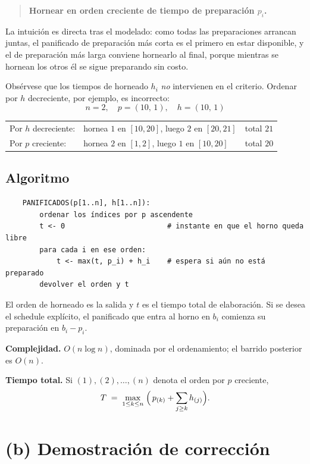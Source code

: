 \documentclass[11pt,a4paper]{article}
\theoremstyle{plain}
\theoremstyle{definition}
\theoremstyle{remark}
\begin{document}
\begin{quote}
\textbf{Hornear en orden creciente de tiempo de preparación $p_i$.}
\end{quote}

La intuición es directa tras el modelado: como todas las preparaciones arrancan
juntas, el panificado de preparación más corta es el primero en estar
disponible, y el de preparación más larga conviene hornearlo al final, porque
mientras se hornean los otros él se sigue preparando sin costo.

Obsérvese que los tiempos de horneado $h_i$ \emph{no} intervienen en el
criterio. Ordenar por $h$ decreciente, por ejemplo, es incorrecto:
\[
  n = 2, \quad p = (10,\,1), \quad h = (10,\,1)
\]
\begin{center}
\begin{tabular}{lll}
  Por $h$ decreciente: & hornea $1$ en $[10,20]$, luego $2$ en $[20,21]$
    & total $21$ \\
  Por $p$ creciente:   & hornea $2$ en $[1,2]$, \; luego $1$ en $[10,20]$
    & total $20$
\end{tabular}
\end{center}

\subsection*{Algoritmo}

\begin{verbatim}
    PANIFICADOS(p[1..n], h[1..n]):
        ordenar los índices por p ascendente
        t <- 0                        # instante en que el horno queda libre
        para cada i en ese orden:
            t <- max(t, p_i) + h_i    # espera si aún no está preparado
        devolver el orden y t
\end{verbatim}

El orden de horneado es la salida y $t$ es el tiempo total de elaboración. Si se
desea el schedule explícito, el panificado que entra al horno en $b_i$ comienza
su preparación en $b_i - p_i$.

\medskip
\noindent
\textbf{Complejidad.} $O(n\log n)$, dominada por el ordenamiento; el barrido
posterior es $O(n)$.

\medskip
\noindent
\textbf{Tiempo total.} Si $(1),(2),\dots,(n)$ denota el orden por $p$ creciente,
\[
  T \;=\; \max_{1\leq k\leq n}\;\Bigl(\, p_{(k)} + \sum_{j\geq k} h_{(j)} \Bigr).
\]

\section*{(b) Demostración de corrección}
\end{document}
